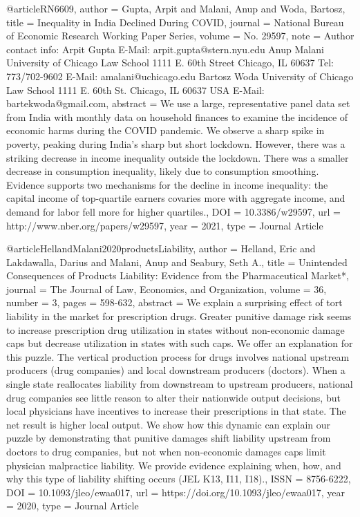 {{{{@article{RN6609,
   author = {Gupta, Arpit and Malani, Anup and Woda, Bartosz},
   title = {Inequality in India Declined During COVID},
   journal = {National Bureau of Economic Research Working Paper Series},
   volume = {No. 29597},
   note = {Author contact info: Arpit Gupta E-Mail: arpit.gupta@stern.nyu.edu Anup Malani University of Chicago Law School 1111 E. 60th Street Chicago, IL 60637 Tel: 773/702-9602 E-Mail: amalani@uchicago.edu Bartosz Woda University of Chicago Law School 1111 E. 60th St. Chicago, IL 60637 USA E-Mail: bartekwoda@gmail.com},
   abstract = {We use a large, representative panel data set from India with monthly data on household finances to examine the incidence of economic harms during the COVID pandemic. We observe a sharp spike in poverty, peaking during India's sharp but short lockdown. However, there was a striking decrease in income inequality outside the lockdown. There was a smaller decrease in consumption inequality, likely due to consumption smoothing. Evidence supports two mechanisms for the decline in income inequality: the capital income of top-quartile earners covaries more with aggregate income, and demand for labor fell more for higher quartiles.},
   DOI = {10.3386/w29597},
   url = {http://www.nber.org/papers/w29597},
   year = {2021},
   type = {Journal Article}
}



@article{HellandMalani2020productsLiability,
   author = {Helland, Eric and Lakdawalla, Darius and Malani, Anup and Seabury, Seth A.},
   title = {Unintended Consequences of Products Liability: Evidence from the Pharmaceutical Market*},
   journal = {The Journal of Law, Economics, and Organization},
   volume = {36},
   number = {3},
   pages = {598-632},
   abstract = {We explain a surprising effect of tort liability in the market for prescription drugs. Greater punitive damage risk seems to increase prescription drug utilization in states without non-economic damage caps but decrease utilization in states with such caps. We offer an explanation for this puzzle. The vertical production process for drugs involves national upstream producers (drug companies) and local downstream producers (doctors). When a single state reallocates liability from downstream to upstream producers, national drug companies see little reason to alter their nationwide output decisions, but local physicians have incentives to increase their prescriptions in that state. The net result is higher local output. We show how this dynamic can explain our puzzle by demonstrating that punitive damages shift liability upstream from doctors to drug companies, but not when non-economic damages caps limit physician malpractice liability. We provide evidence explaining when, how, and why this type of liability shifting occurs (JEL K13, I11, I18).},
   ISSN = {8756-6222},
   DOI = {10.1093/jleo/ewaa017},
   url = {https://doi.org/10.1093/jleo/ewaa017},
   year = {2020},
   type = {Journal Article}
}

}}}}
